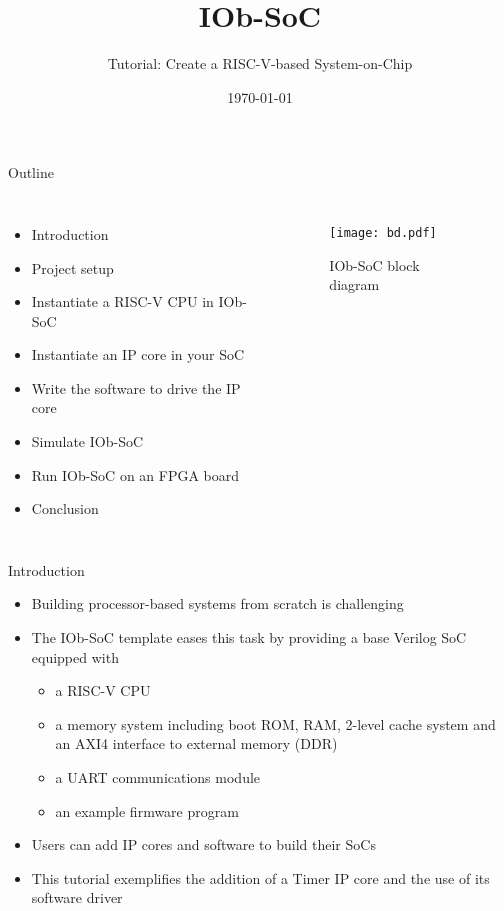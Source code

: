 \documentclass [xcolor=svgnames, t] {beamer}
\title[IOb-SoC Presentation]{IOb-SoC}
\subtitle{Tutorial: Create a RISC-V-based System-on-Chip}
\institute[IObundle Lda.]{IObundle Lda.}
\date{\today}
\begin{document}
\begin{frame}
 \titlepage
\end{frame}


\begin{frame}{Outline}
\begin{center}
  \begin{columns}[onlytextwidth]
  \begin{itemize}
  \item Introduction
  \item Project setup
  \item Instantiate a RISC-V CPU in IOb-SoC
  \item Instantiate an IP core in your SoC
  \item Write the software to drive the IP core
  \item Simulate IOb-SoC
  \item Run IOb-SoC on an FPGA board
  \item Conclusion
  \end{itemize}
    \begin{figure}
      \centering
      \texttt{[image: bd.pdf]}
      \caption{IOb-SoC block diagram}
      \label{fig:my_label}
    \end{figure}
  \end{columns}
\end{center}
\end{frame}


\begin{frame}{Introduction}
\begin{center}
    \begin{itemize}
      \item Building processor-based systems from scratch is challenging
      \item The IOb-SoC template eases this task by providing a base Verilog SoC equipped with
        \begin{itemize}
        \item a RISC-V CPU
        \item a memory system including boot ROM, RAM, 2-level cache system and an AXI4 interface to external memory (DDR)
        \item a UART communications module
        \item an example firmware program
        \end{itemize}
      \item Users can add IP cores and software to build their SoCs
      \item This tutorial exemplifies the addition of a Timer IP core and the use of its software driver
    \end{itemize}
\end{center}
\end{frame}
\end{document}
